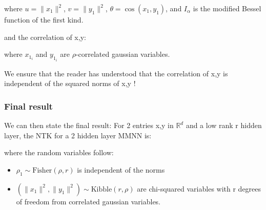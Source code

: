 \documentclass[11pt, a4paper]{article}
\begin{document}
where $u = \|x_1\|^2$, $v = \|y_1\|^2$, $\theta = \cos(x_1,y_1)$, and $I_\alpha$ is the modified Bessel function of the first kind.

and the correlation of x,y: 

where $x_1_i$ and $y_1_i$ are $\rho$-correlated gaussian variables.

We ensure that the reader has understood that the correlation of x,y is independent of the squared norms of x,y !

\subsubsection{Final result}
We can then state the final result: For 2 entries x,y in $\mathbb{R}^d$ and a low rank r hidden layer, the NTK for a 2 hidden layer MMNN is:


\begin{center}
    
    \newline
{}
\end{center}

where the random variables follow:
\begin{itemize}
\item $\rho_1 \sim \text{Fisher}(\rho, r)$ is independent of the norms
\item $(\|x_1\|^2, \|y_1\|^2) \sim \text{Kibble}(r, \rho)$ are chi-squared variables with r degrees of freedom from correlated gaussian variables.
\end{itemize}
\end{document}

